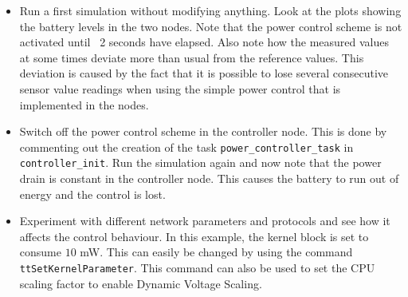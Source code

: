 \documentclass[final,twoside]{rapport}
\begin{document}
\begin{itemize}
\item Run a first simulation without modifying anything. Look at the plots
   showing the battery levels in the two nodes. Note that the power control
   scheme is not activated until ~2 seconds have elapsed. Also note how the 
   measured values at some times deviate more than usual from the reference
   values. This deviation is caused by the fact that it is possible to lose
   several consecutive sensor value readings when using the simple power 
   control that is implemented in the nodes.

\item Switch off the power control scheme in the controller node. This is done
   by commenting out the creation of the task {\tt power\_controller\_task} in 
   {\tt controller\_init}. Run the simulation again and now note that the power drain
   is constant in the controller node. This causes the battery to run out
   of energy and the control is lost.

\item Experiment with different network
   parameters and protocols and see how it affects the control
   behaviour. In this example, the kernel block is set to consume
   $10$ mW. This can easily be changed by using the command {\tt
     ttSetKernelParameter}. This command can also be used to set the
   CPU scaling factor to enable Dynamic Voltage Scaling.

\end{itemize}


\end{document}
